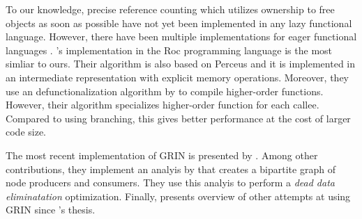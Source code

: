 \documentclass[9pt, twocolumn]{article}
\begin{document}
To our knowledge, precise reference counting which utilizes ownership to free objects as soon as possible have not yet been implemented in any lazy functional language.
However, there have been multiple implementations for eager functional languages \citep{reinking2021, ullrich2021, teeuwissen2023, pinto2023}.
\citeauthor{teeuwissen2023}'s implementation in the Roc programming language is the most simliar to ours.
Their algorithm is also based on Perceus and it is implemented in an intermediate representation with explicit memory operations.
Moreover, they use an defunctionalization algorithm by \citet{brandon2023} to compile higher-order functions.
However, their algorithm specializes higher-order function for each callee.
Compared to using branching, this gives better performance at the cost of larger code size.

The most recent implementation of GRIN is presented by \citet{podlovics2021}.
Among other contributions, they implement an analyis by \citet{turk2010} that creates a bipartite graph of node producers and consumers.
They use this analyis to perform a \emph{dead data eliminatation} optimization. 
Finally, \citet{podlovics2021} presents overview of other attempts at using GRIN since \citeauthor{boquist1999}'s thes\-is.



%




\end{document}
